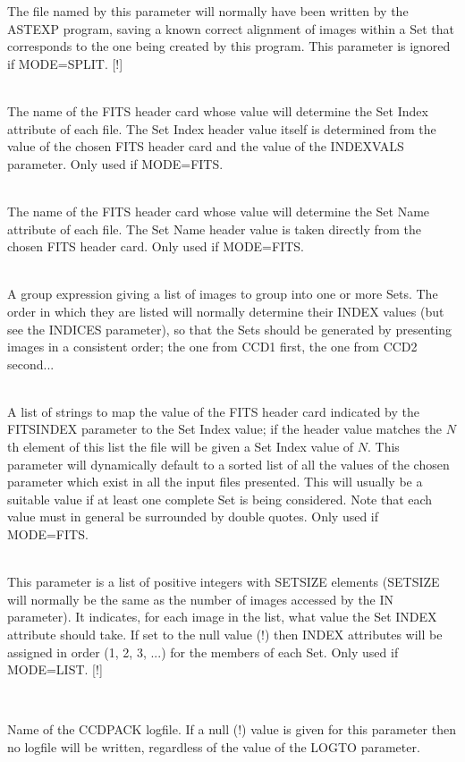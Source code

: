 \documentclass[twoside,11pt]{article}
\newcommand{\htmlref}[2]{#1}
\renewcommand{\_}{\texttt{\symbol{95}}}
\newcommand{\xroutine}[1]{\htmlref{{\sc #1}}{#1}}
\newcommand{\sstsubsection}[1]{ \item[{#1}] \mbox{} \\}
\newcommand{\sstsubsection}[1]{\item[{#1}]}
\begin{document}
{{{         The file named by this parameter will normally have been
         written by the \xroutine{ASTEXP} program, saving a known correct
         alignment of images within a Set that corresponds to
         the one being created by this program.  This parameter
         is ignored if MODE=SPLIT.
         [!]
      }
      \sstsubsection{
         FITSINDEX = LITERAL (Read)
      }{
         The name of the FITS header card whose value will determine
         the Set Index attribute of each file.  The Set Index
         header value itself is determined from the value of the
         chosen FITS header card and the value of the INDEXVALS
         parameter.  Only used if MODE=FITS.
      }
      \sstsubsection{
         FITSNAME = LITERAL (Read)
      }{
         The name of the FITS header card whose value will determine
         the Set Name attribute of each file.  The Set Name header
         value is taken directly from the chosen FITS header card.
         Only used if MODE=FITS.
      }
      \sstsubsection{
         IN = LITERAL (Read)
      }{
         A group expression giving a list of images to group into one
         or more Sets.  The order in which they are listed will
         normally determine their INDEX values (but see the INDICES
         parameter), so that the Sets should be generated by
         presenting images in a consistent order; the one from CCD1
         first, the one from CCD2 second...
      }
      \sstsubsection{
         INDEXVALS( $*$ ) = LITERAL (Read)
      }{
         A list of strings to map the value of the
         FITS header card indicated by the FITSINDEX parameter to
         the Set Index value; if the header value matches the $N$th
         element of this list the file will be given a Set Index
         value of $N$.  This parameter will dynamically default to
         a sorted list of all the values of the chosen parameter
         which exist in all the input files presented.  This will
         usually be a suitable value if at least one complete Set
         is being considered.  Note that each value must in general
         be surrounded by double quotes.  Only used if MODE=FITS.
      }
      \sstsubsection{
         INDICES( $*$ ) = \_INTEGER  (Read)
      }{
         This parameter is a list of positive integers with SETSIZE
         elements (SETSIZE will normally be the same as the number of
         images accessed by the IN parameter).  It indicates, for each
         image in the list, what value the Set INDEX attribute should
         take.  If set to the null value (!) then INDEX attributes
         will be assigned in order (1, 2, 3, ...) for the members of
         each Set.  Only used if MODE=LIST.
         [!]
      }
      \sstsubsection{
         LOGFILE = FILENAME (Read)
      }{
         Name of the CCDPACK logfile.  If a null (!) value is given for
         this parameter then no logfile will be written, regardless of
         the value of the LOGTO parameter.

}}}
\end{document}
